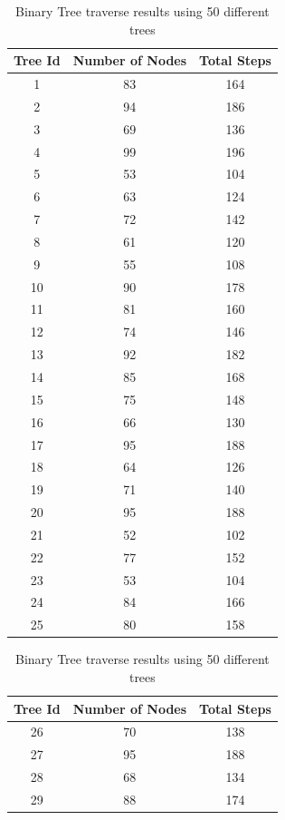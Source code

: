 \documentclass[12p]{report}
\begin{document}
\footnotesize
\begin{table}[ht]
\caption{Binary Tree traverse results using 50 different trees}	%
\begin{tabular}{c c c} 							%
\hline\hline 									%
Tree Id & Number of Nodes & Total Steps\\ [0.5ex] 			%
\hline %
1 & 83 & 164 \\ 								%
2 & 94 & 186 \\
3 & 69 & 136 \\
4 & 99 & 196 \\
5 & 53 & 104 \\
6 & 63 & 124 \\
7 & 72 & 142 \\
8 & 61 & 120 \\
9 & 55 & 108 \\
10 & 90 & 178 \\
11 & 81 & 160 \\
12 & 74 & 146 \\
13 & 92 & 182 \\
14 & 85 & 168 \\
15 & 75 & 148 \\
16 & 66 & 130 \\
17 & 95 & 188 \\
18 & 64 & 126 \\
19 & 71 & 140 \\
20 & 95 & 188 \\
21 & 52 & 102 \\
22 & 77 & 152 \\
23 & 53 & 104 \\
24 & 84 & 166 \\
25 & 80 & 158 \\
\hline %
\end{tabular}
\qquad
\begin{tabular}{c c c} 							%
\hline\hline 									%
Tree Id & Number of Nodes & Total Steps\\ [0.5ex] 			%
\hline %
26 & 70 & 138 \\
27 & 95 & 188 \\
28 & 68 & 134 \\
29 & 88 & 174 \\

\end{tabular}
\end{table}
\end{document}
